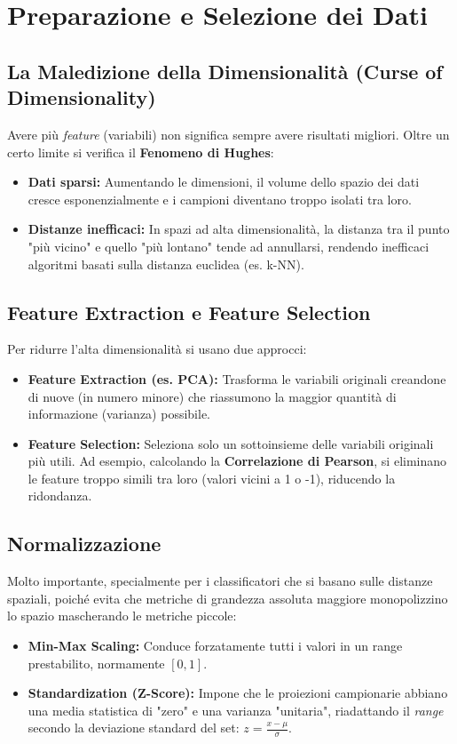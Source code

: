 \section{Preparazione e Selezione dei Dati}

\subsection{La Maledizione della Dimensionalità (Curse of Dimensionality)}
Avere più \textit{feature} (variabili) non significa sempre avere risultati migliori.
Oltre un certo limite si verifica il \textbf{Fenomeno di Hughes}:
\begin{itemize}
    \item \textbf{Dati sparsi:} Aumentando le dimensioni, il volume dello spazio dei dati cresce esponenzialmente e i campioni diventano troppo isolati tra loro.
    \item \textbf{Distanze inefficaci:} In spazi ad alta dimensionalità, la distanza tra il punto "più vicino" e quello "più lontano" tende ad annullarsi, rendendo inefficaci algoritmi basati sulla distanza euclidea (es. k-NN).
\end{itemize}

\subsection{Feature Extraction e Feature Selection}
Per ridurre l'alta dimensionalità si usano due approcci:
\begin{itemize}
    \item \textbf{Feature Extraction (es. PCA):} Trasforma le variabili originali creandone di nuove (in numero minore) che riassumono la maggior quantità di informazione (varianza) possibile.
    \item \textbf{Feature Selection:} Seleziona solo un sottoinsieme delle variabili originali più utili.
    Ad esempio, calcolando la \textbf{Correlazione di Pearson}, si eliminano le feature troppo simili tra loro (valori vicini a 1 o -1), riducendo la ridondanza.
\end{itemize}

\subsection{Normalizzazione}
Molto importante, specialmente per i classificatori che si basano sulle distanze spaziali, poiché evita che metriche di grandezza assoluta maggiore monopolizzino lo spazio mascherando le metriche piccole:
\begin{itemize}
    \item \textbf{Min-Max Scaling:} Conduce forzatamente tutti i valori in un range prestabilito, normamente $[0, 1]$.
    \item \textbf{Standardization (Z-Score):} Impone che le proiezioni campionarie abbiano una media statistica di "zero" e una varianza "unitaria", riadattando il \textit{range} secondo la deviazione standard del set: $\displaystyle z = \frac{x - \mu}{\sigma}$.
\end{itemize}

